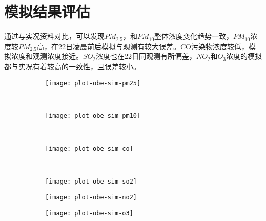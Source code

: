 \section{模拟结果评估}

通过与实况资料对比，可以发现$PM_{2.5}$，和$PM_{10}$整体浓度变化趋势一致，$PM_{10}$浓度较$PM_{2.5}$高，在22日凌晨前后模拟与观测有较大误差。CO污染物浓度较低，模拟浓度和观测浓度接近。$SO_{2}$浓度也在22日同观测有所偏差，$NO_{2}$和$O_{3}$浓度的模拟都与实况有着较高的一致性，且误差较小。

\begin{figure}[!htbp]
    \centering
    \begin{subfigure}[b]{0.40\textwidth}
      \texttt{[image: plot-obe-sim-pm25]}
      \caption{}
      \label{fig:plot-obe-sim-pm25}
    \end{subfigure}%
    ~%
    \begin{subfigure}[b]{0.40\textwidth}
      \texttt{[image: plot-obe-sim-pm10]}
      \caption{}
      \label{fig:plot-obe-sim-pm10}
    \end{subfigure}
    \\%
    \begin{subfigure}[b]{0.40\textwidth}
      \texttt{[image: plot-obe-sim-co]}
      \caption{}
      \label{fig:plot-obe-sim-co}
    \end{subfigure}%
    ~%
    \begin{subfigure}[b]{0.40\textwidth}
      \texttt{[image: plot-obe-sim-so2]}
      \caption{}
      \label{fig:plot-obe-sim-so2}
    \end{subfigure}
    \begin{subfigure}[b]{0.40\textwidth}
      \texttt{[image: plot-obe-sim-no2]}
      \caption{}
      \label{fig:plot-obe-sim-no2}
    \end{subfigure}
    \begin{subfigure}[b]{0.40\textwidth}
      \texttt{[image: plot-obe-sim-o3]}
      \caption{}
      \label{fig:plot-obe-sim-o3}
    \end{subfigure}


    \label{fig:oaspl}
\end{figure}

